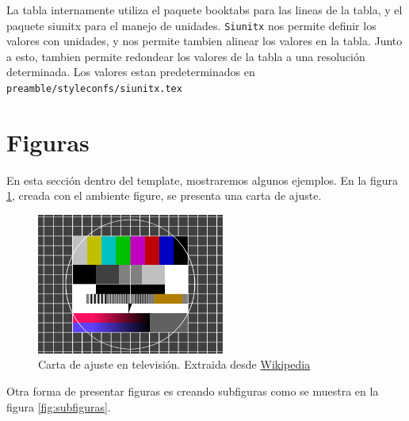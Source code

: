 La tabla internamente utiliza el paquete booktabs para las lineas de la tabla, y el paquete siunitx para el manejo de unidades.
\texttt{Siunitx} nos permite definir los valores con unidades, y nos permite tambien alinear los valores en la tabla.
Junto a esto, tambien permite redondear los valores de la tabla a una resolución determinada. 
Los valores estan predeterminados en \texttt{preamble/styleconfs/siunitx.tex}


\section{Figuras}
En esta sección dentro del template, mostraremos algunos ejemplos. En la figura \ref{fig:ejemplo}, creada con el ambiente figure, se presenta una carta de ajuste.

\begin{figure}[htb]
    \centering
    \includegraphics[width=0.55\textwidth,keepaspectratio]{content/images/testimage.png}
    \caption{Carta de ajuste en televisión. Extraida desde \href{https://es.wikipedia.org/wiki/Carta_de_ajuste}{Wikipedia}}
    \label{fig:ejemplo}
\end{figure}


Otra forma de presentar figuras es creando subfiguras como se muestra en la figura \ref{fig:subfiguras}.

